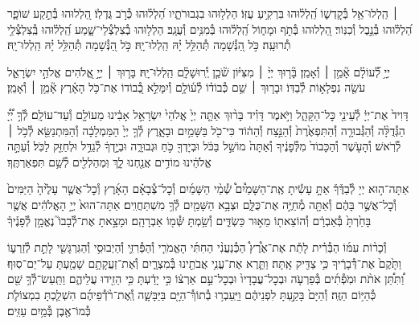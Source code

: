 \documentclass[twoside, openany, parskip=half, 11pt]{book}
\begin{document}
 ׀ \hfill
הַֽלְלוּ־אֵ֥ל בְּ֯קׇדְשׁ֑וֹ הַֽ֝לְל֗וּהוּ בִּרְקִ֥יעַ עֻזּֽוֹ׃
הַלְל֥וּהוּ בִגְבוּרֹתָ֑יו הַ֝לְל֗וּהוּ כְּ֯רֹ֣ב גֻּדְלֽוֹ׃
הַ֭לְלוּהוּ בְּ֯תֵ֣קַע שׁוֹפָ֑ר הַ֝לְל֗וּהוּ בְּ֯נֵ֣בֶל וְ֯כִנּֽוֹר׃
הַ֭לְלוּהוּ בְּ֯תֹ֣ף וּמָח֑וֹל הַֽ֝לְל֗וּהוּ בְּ֯מִנִּ֥ים וְ֯עֻגָֽב׃
הַלְל֥וּהוּ בְ֯צִלְצְ֯לֵי־שָׁ֑מַע הַֽ֝לְל֗וּהוּ בְּֽ֯צִלְצְ֯לֵ֥י תְ֯רוּעָֽה׃
כֹּ֣ל הַ֭נְּ֯שָׁמָה תְּ֯הַלֵּ֥ל יָ֗הּ הַֽלְלוּ־יָֽהּ׃
\scriptsize{כֹּ֣ל הַ֭נְּ֯שָׁמָה תְּ֯הַלֵּ֥ל יָ֗הּ הַֽלְלוּ־יָֽהּ׃ \\}
\normalsize{}

\negline

יְיָ֥ לְ֯֝עוֹלָ֗ם אָ֘מֵ֥ן ׀ וְ֯אָמֵֽן׃ \hfill \break
{}בָּ֘ר֤וּךְ יְיָ֨ ׀ מִצִּיּ֗וֹן שֹׁ֘כֵ֤ן יְֽ֯רוּשָׁלָ֗‍ִם הַֽלְלוּ־יָֽהּ׃ \hfill \break
{}בָּר֤וּךְ ׀ יְיָ֣ אֱ֭לֹהִים אֱלֹהֵ֣י יִשְׂרָאֵ֑ל עֹשֵׂ֖ה נִפְלָא֣וֹת לְ֯בַדּֽוֹ׃ \hfill \break
וּבָר֤וּךְ ׀ שֵׁ֥ם כְּ֯בוֹד֗וֹ לְ֯ע֫וֹלָ֥ם וְ֯יִמָּלֵ֣א כְ֭֯בוֹדוֹ אֶת־כֹּ֥ל הָאָ֗רֶץ אָ֘מֵ֥ן ׀ וְ֯אָמֵֽן׃





דָּוִיד֙ אֶת־יְיָ֔ לְ֯עֵינֵ֖י כׇּל־הַקָּהָ֑ל וַיֹּ֣אמֶר דָּוִ֗יד בָּר֨וּךְ אַתָּ֤ה יְיָ֙ אֱלֹהֵי֙ יִשְׂרָאֵ֣ל אָבִ֔ינוּ מֵעוֹלָ֖ם וְ֯עַד־עוֹלָֽם׃
לְ֯ךָ֣ יְ֠יָ֠ הַגְּ֯דֻלָּ֨ה וְ֯הַגְּ֯בוּרָ֤ה וְ֯הַתִּפְאֶ֙רֶת֙ וְ֯הַנֵּ֣צַח וְ֯הַה֔וֹד כִּי־כֹ֖ל בַּשָּׁמַ֣יִם וּבָאָ֑רֶץ לְ֯ךָ֤ יְיָ֙ הַמַּמְלָכָ֔ה וְ֯הַמִּתְנַשֵּׂ֖א לְ֯כֹ֥ל ׀ לְ֯רֹֽאשׁ׃
וְ֯הָעֹ֤שֶׁר וְ֯הַכָּבוֹד֙ מִלְּ֯פָנֶ֔יךָ וְ֯אַתָּה֙ מוֹשֵׁ֣ל בַּכֹּ֔ל וּבְיָדְךָ֖ כֹּ֣חַ וּגְבוּרָ֑ה וּבְיָ֣דְךָ֔ לְ֯גַדֵּ֥ל וּלְחַזֵּ֖ק לַכֹּֽל׃
וְ֯עַתָּ֣ה אֱלֹהֵ֔ינוּ מוֹדִ֥ים אֲנַ֖חְנוּ לָ֑ךְ וּֽמְהַלְלִ֖ים לְ֯שֵׁ֥ם תִּפְאַרְתֶּֽךָ׃





אַתָּה־ה֣וּא
יְיָ לְ֯בַדֶּ֒ךָ֒ אַתָּ֣ עָשִׂ֡יתָ אֶֽת־הַשָּׁמַ֩יִם֩ שְׁ֯מֵ֨י הַשָּׁמַ֜יִם וְ֯כׇל־צְ֯בָאָ֗ם הָאָ֜רֶץ וְ֯כׇל־אֲשֶׁ֤ר עָלֶ֙יהָ֙ הַיַּמִּים֙ וְ֯כׇל־אֲשֶׁ֣ר בָּהֶ֔ם וְ֯אַתָּ֖ה מְ֯חַיֶּ֣ה אֶת־כֻּלָּ֑ם וּצְבָ֥א הַשָּׁמַ֖יִם לְ֯ךָ֥ מִשְׁתַּחֲוִֽים׃
אַתָּה־הוּא֙ יְיָ֣ הָאֱלֹהִ֔ים אֲשֶׁ֤ר בָּחַ֙רְתָּ֙ בְּ֯אַבְרָ֔ם וְ֯הוֹצֵאת֖וֹ מֵא֣וּר כַּשְׂדִּ֑ים וְ֯שַׂ֥מְתָּ שְּׁ֯מ֖וֹ אַבְרָהָֽם׃ וּמָצָ֣אתָ אֶת־לְ֯בָבוֹ֮ נֶאֱמָ֣ן לְ֯פָנֶ֒יךָ֒

וְ֯כָר֨וֹת עִמּ֜וֹ הַבְּ֯רִ֗ית לָתֵ֡ת אֶת־אֶ֩רֶץ֩ הַכְּ֯נַעֲנִ֨י הַחִתִּ֜י הָאֱמֹרִ֧י וְ֯הַפְּ֯רִזִּ֛י וְ֯הַיְבוּסִ֥י וְ֯הַגִּרְגָּשִׁ֖י לָתֵ֣ת לְ֯זַרְע֑וֹ וַתָּ֙קֶם֙ אֶת־דְּ֯בָרֶ֔יךָ כִּ֥י צַדִּ֖יק אָֽתָּה׃ וַתֵּ֛רֶא אֶת־עֳנִ֥י אֲבֹתֵ֖ינוּ בְּ֯מִצְרָ֑יִם וְ֯אֶת־זַעֲקָתָ֥ם שָׁמַ֖עְתָּ עַל־יַם־סֽוּף׃ וַ֠תִּתֵּ֠ן אֹתֹ֨ת וּמֹֽפְ֯תִ֜ים בְּ֯פַרְעֹ֤ה וּבְכׇל־עֲבָדָיו֙ וּבְכׇל־עַ֣ם אַרְצ֔וֹ כִּ֣י יָדַ֔עְתָּ כִּ֥י הֵזִ֖ידוּ עֲלֵיהֶ֑ם וַתַּֽעַשׂ־לְ֯ךָ֥ שֵׁ֖ם כְּ֯הַיּ֥וֹם הַזֶּֽה׃
וְ֯הַיָּם֙ בָּקַ֣עְתָּ לִפְנֵיהֶ֔ם וַיַּֽעַבְר֥וּ בְ֯תוֹךְ֯־הַיָּ֖ם בַּיַּבָּשָׁ֑ה וְֽ֯אֶת־רֹ֨דְ֯פֵיהֶ֜ם הִשְׁלַ֧כְתָּ בִמְצוֹלֹ֛ת כְּ֯מוֹ־אֶ֖בֶן בְּ֯מַ֥יִם עַזִּֽים׃
\end{document}

